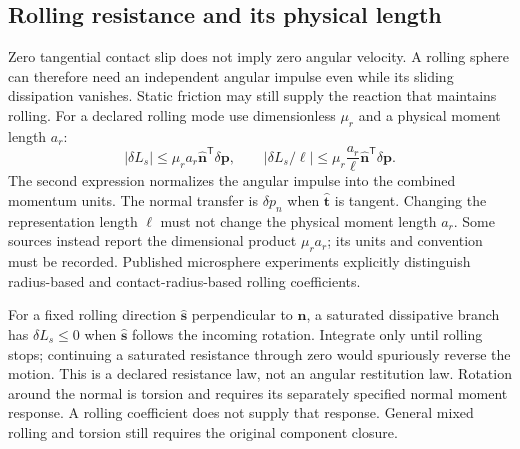 \documentclass[11pt,a4paper]{article}
\begin{document}
\subsection{Rolling resistance and its physical length}
Zero tangential contact slip does not imply zero angular velocity. A rolling sphere can therefore need an independent angular impulse even while its sliding dissipation vanishes. Static friction may still supply the reaction that maintains rolling. For a declared rolling mode use dimensionless $\mu_r$ and a physical moment length $a_r$:
\begin{equation}
 |\delta L_s|\le\mu_r a_r\hat{\mathbf n}^{\mathsf T}\delta\mathbf p,\qquad
 |\delta L_s/\ell|\le\mu_r\frac{a_r}{\ell}\hat{\mathbf n}^{\mathsf T}\delta\mathbf p.
\end{equation}
The second expression normalizes the angular impulse into the combined momentum units. The normal transfer is $\delta p_n$ when $\hat{\mathbf t}$ is tangent. Changing the representation length $\ell$ must not change the physical moment length $a_r$. Some sources instead report the dimensional product $\mu_r a_r$; its units and convention must be recorded. Published microsphere experiments explicitly distinguish radius-based and contact-radius-based rolling coefficients\cite{fuchsrolling}.

For a fixed rolling direction $\hat{\mathbf s}$ perpendicular to $\hat{\mathbf n}$, a saturated dissipative branch has $\delta L_s\le0$ when $\hat{\mathbf s}$ follows the incoming rotation. Integrate only until rolling stops; continuing a saturated resistance through zero would spuriously reverse the motion. This is a declared resistance law, not an angular restitution law. Rotation around the normal is torsion and requires its separately specified normal moment response. A rolling coefficient does not supply that response. General mixed rolling and torsion still requires the original component closure.
\end{document}

